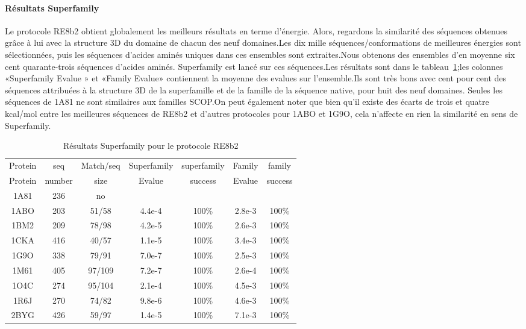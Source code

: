    \paragraph{Résultats Superfamily}
Le protocole RE8b2 obtient globalement les meilleurs résultats en terme d'énergie. Alors, regardons la similarité des séquences obtenues grâce à lui avec la structure 3D du domaine de chacun des neuf domaines.Les dix mille séquences/conformations de meilleures énergies sont sélectionnées, puis les séquences d'acides aminés uniques dans ces ensembles sont extraites.Nous obtenons des ensembles d'en moyenne six cent quarante-trois séquences d'acides aminés. Superfamily est lancé sur ces séquences.Les résultats sont dans le tableau~\ref{tab:superfamily_bestRE};les colonnes «Superfamily Evalue » et «Family Evalue» contiennent la moyenne des evalues sur l'ensemble.Ils sont très bons avec cent pour cent des séquences attribuées à la structure 3D de la superfamille et de la famille de la séquence native, pour huit des neuf domaines. Seules les séquences de 1A81  ne sont similaires aux familles SCOP.On peut également noter que  bien qu'il existe des écarts de trois et quatre kcal/mol entre les meilleures séquences de RE8b2 et d'autres protocoles pour 1ABO et 1G9O, cela n'affecte en rien la similarité en sens de Superfamily.

    \begin{table}[h]
           \raggedleft{}

      \begin{tabular}{ccccccc}

        \toprule
        Protein & seq  & Match/seq & Superfamily & superfamily & Family & family \\
        Protein & number & size & Evalue & success & Evalue &  success\\
        \cmidrule{1-7}
        1A81 & 236 & no & & & & \\
        1ABO & 203 & 51/58  & 4.4e-4 & 100\% & 2.8e-3 & 100\% \\
        1BM2 & 209 & 78/98  & 4.2e-5 & 100\% & 2.6e-3 & 100\% \\
        1CKA & 416 & 40/57  & 1.1e-5 & 100\% & 3.4e-3 & 100\% \\
        1G9O & 338 & 79/91  & 7.0e-7 & 100\% & 2.5e-3 & 100\%  \\
        1M61 & 405 & 97/109 & 7.2e-7 & 100\% & 2.6e-4 &  100\% \\
        1O4C & 274 & 95/104 & 2.1e-4 & 100\% & 4.5e-3 &  100\% \\
        1R6J & 270 & 74/82  & 9.8e-6 & 100\% & 4.6e-3 &  100\% \\
        2BYG & 426 & 59/97  & 1.4e-5 & 100\% & 7.1e-3 &  100\% \\
        \bottomrule        
      \end{tabular}   
     \caption{Résultats Superfamily pour le protocole RE8b2}   
\label{tab:superfamily_bestRE}       
\end{table}

